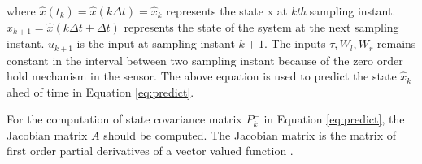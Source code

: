 where $\hat{x}(t_k) = \hat{x}(k \Delta t) = \hat{x}_k$ represents the state x at \emph{kth} sampling instant. $\hat{x}_{k+1} = \hat{x}(k \Delta t + \Delta t)$ represents the state of the system at the next sampling instant. $u_{k+1}$ is the input at sampling instant $k+1$. The inputs $\tau, W_l, W_r$ remains constant in the interval between two sampling instant because of the zero order hold mechanism in the sensor. The above equation is used to predict the state $\hat{x}_k$ ahed of time in Equation \ref{eq:predict}. 

For the computation of state covariance matrix $P_k^-$ in Equation \ref{eq:predict}, the Jacobian matrix $A$ should be computed. The Jacobian matrix is the matrix of first order partial derivatives of a vector valued function \citep{wal76}.

